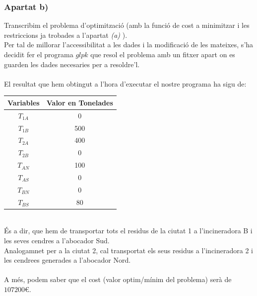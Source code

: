 \documentclass[a4paper, 11pt]{article}
\begin{document}
\subsubsection{Apartat b)}
Transcribim el problema d'optimització (amb la funció de cost a minimitzar i les restriccions ja trobades a l'apartat \textit{(a)} ).\\
Per tal de millorar l'accessibilitat a les dades i la modificació de les mateixes, s'ha decidit fer el programa $glpk$ que resol el problema amb un fitxer apart on es guarden les dades necesaries per a resoldre'l.\\
\\
El resultat que hem obtingut a l'hora d'executar el nostre programa ha sigu de:
\begin{table}[h]
    \centering
    \begin{tabular}{ c | c }
        \textbf{Variables} & \textbf{Valor en Tonelades} \\ \hline
        $T_{1A}$ & 0 \\ \hline
        $T_{1B}$ & 500 \\ \hline
        $T_{2A}$ & 400 \\ \hline
        $T_{2B}$ & 0 \\ \hline
        $T_{AN}$ & 100 \\ \hline
        $T_{AS}$ & 0 \\ \hline
        $T_{BN}$ & 0 \\ \hline
        $T_{BS}$ & 80 \\
    \end{tabular}
\end{table}\\
És a dir, que hem de transportar tots el residus de la ciutat 1 a l'incineradora B i les seves cendres a l'abocador Sud.\\
Analogamnet per a la ciutat 2, cal transportat els seus residus a l'incineradora 2 i les cendrees generades a l'abocador Nord.\\
\\
A més, podem saber que el cost (valor optim/mínim del problema) serà de $107200$\euro.\\
\newpage
\end{document}
